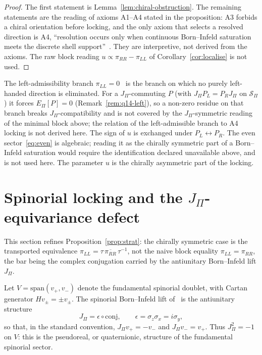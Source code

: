 \documentclass[11pt]{article}
\theoremstyle{definition}
\newcommand{\EPi}{E_\Pi}
\begin{document}
    \begin{proof}
      The first statement is Lemma~\ref{lem:chiral-obstruction}.
      The remaining statements are the reading of axioms A1--A4 stated in the proposition: A3 forbids a chiral
      orientation before locking, and the only axiom that selects a resolved direction is A4,
      ``resolution occurs only when continuous Born--Infeld saturation meets the discrete shell
      support''~\cite{Beau2026m}.
      They are interpretive, not derived from the axioms.
      The raw block reading $u\propto\pi_{RR}-\pi_{LL}$ of Corollary~\ref{cor:localise} is not used.
    \end{proof}

    The left-admissibility branch $\pi_{LL}=0$~\cite{Beau2026q14} is the branch on which no purely left-handed
    direction is eliminated.
    For a $J_\Pi$-commuting $P$ (with $J_\Pi P_L=P_RJ_\Pi$ on $\mathcal S_\Pi$) it forces $\EPi[P]=0$
    (Remark~\ref{rem:q14-left}), so a non-zero residue on that branch breaks $J_\Pi$-compatibility and is not covered by the $J_\Pi$-symmetric reading of the minimal
    block above; the relation of the left-admissible branch to A4 locking is not derived here.
    The sign of $u$ is exchanged under $P_L\leftrightarrow P_R$.
    The even sector~\eqref{eq:even} is algebraic; reading it as the chirally symmetric part of a
    Born--Infeld saturation would require the identification declared unavailable above, and is not
    used here.
    The parameter $u$ is the chirally asymmetric part of the locking.

  \section{Spinorial locking and the \texorpdfstring{$J_\Pi$}{JΠ}-equivariance defect}
    \label{sec:spinorial-locking}

    This section refines Proposition~\ref{prop:strat}: the chirally symmetric case is the transported
    equivalence $\pi_{LL}=\tau\,\overline{\pi_{RR}}\,\tau^{-1}$, not the naive block equality
    $\pi_{LL}=\pi_{RR}$, the bar being the complex conjugation carried by the antiunitary Born--Infeld
    lift $J_\Pi$.

    Let $V=\mathrm{span}(v_+,v_-)$ denote the fundamental spinorial doublet, with Cartan generator
    $Hv_\pm=\pm v_\pm$.
    The spinorial Born--Infeld lift of~\cite{Beau2026q14} is the antiunitary structure
    \begin{equation}
      \label{eq:jpidef}
      J_\Pi=\epsilon\circ\mathrm{conj},\qquad \epsilon=\sigma_z\sigma_x=i\sigma_y,
    \end{equation}
    so that, in the standard convention, $J_\Pi v_+=-v_-$ and $J_\Pi v_-=v_+$.
    Thus $J_\Pi^2=-1$ on $V$: this is the pseudoreal, or quaternionic, structure of the
    fundamental spinorial sector.
\end{document}
